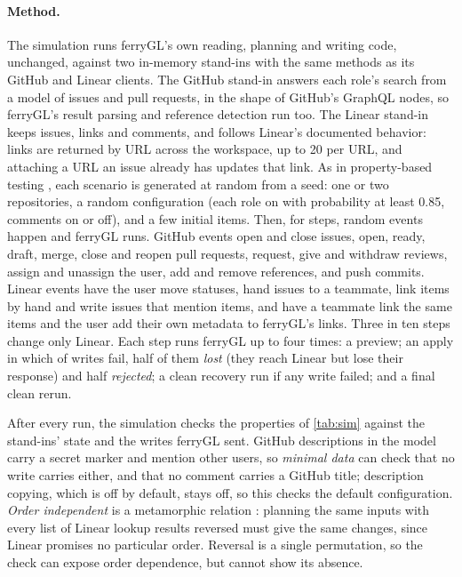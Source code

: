 \documentclass[11pt,a4paper]{article}
\newcommand{\ferry}{ferryGL}
\begin{document}
\paragraph{Method.} The simulation runs \ferry's own reading, planning and writing code,
unchanged, against two in-memory stand-ins with the same methods as its GitHub and Linear
clients. The GitHub stand-in answers each role's search from a model of issues and pull
requests, in the shape of GitHub's GraphQL nodes, so \ferry's result parsing and reference
detection run too. The Linear stand-in keeps issues, links and comments, and follows Linear's
documented behavior: links are returned by URL across the workspace, up to 20 per URL, and
attaching a URL an issue already has updates that link. As in property-based testing
\cite{claessen2000quickcheck}, each scenario is generated at random from a seed: one or two
repositories, a random configuration (each role on with probability at least 0.85, comments on
or off), and a few initial items. Then, for \SimSteps{} steps, random events happen and \ferry{}
runs. GitHub events open and close issues, open, ready, draft, merge, close and reopen pull
requests, request, give and withdraw reviews, assign and unassign the user, add and remove
references, and push commits. Linear events have the user move statuses, hand issues to a
teammate, link items by hand and write issues that mention items, and have a teammate link the
same items and the user add their own metadata to \ferry's links. Three in ten steps change only
Linear. Each step runs \ferry{} up to four times: a preview; an apply in which \SimFaultRate{} of
writes fail, half of them \emph{lost} (they reach Linear but lose their response) and half
\emph{rejected}; a clean recovery run if any write failed; and a final clean rerun.

After every run, the simulation checks the properties of \cref{tab:sim} against the stand-ins'
state and the writes \ferry{} sent. GitHub descriptions in the model carry a secret marker and
mention other users, so \emph{minimal data} can check that no write carries either, and that no
comment carries a GitHub title; description copying, which is off by default, stays off, so this
checks the default configuration. \emph{Order independent} is a metamorphic relation
\cite{chen1998metamorphic, chen2018metamorphic}: planning the same inputs with every list of
Linear lookup results reversed must give the same changes, since Linear promises no particular
order. Reversal is a single permutation, so the check can expose order dependence, but cannot
show its absence.
\end{document}
